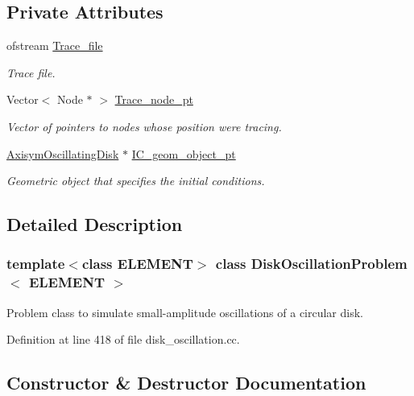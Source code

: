 \subsection*{Private Attributes}
\begin{DoxyCompactItemize}
\item 
ofstream \hyperlink{classDiskOscillationProblem_a45a4b574c10c6416b3b6be950713f505}{Trace\+\_\+file}
\begin{DoxyCompactList}\small\item\em Trace file. \end{DoxyCompactList}\item 
Vector$<$ Node $\ast$ $>$ \hyperlink{classDiskOscillationProblem_a141a79f41b33b19a6fca57793836e4da}{Trace\+\_\+node\+\_\+pt}
\begin{DoxyCompactList}\small\item\em Vector of pointers to nodes whose position we\textquotesingle{}re tracing. \end{DoxyCompactList}\item 
\hyperlink{classAxisymOscillatingDisk}{Axisym\+Oscillating\+Disk} $\ast$ \hyperlink{classDiskOscillationProblem_a338517a04848bb75252751df32879e40}{I\+C\+\_\+geom\+\_\+object\+\_\+pt}
\begin{DoxyCompactList}\small\item\em Geometric object that specifies the initial conditions. \end{DoxyCompactList}\end{DoxyCompactItemize}


\subsection{Detailed Description}
\subsubsection*{template$<$class E\+L\+E\+M\+E\+NT$>$\newline
class Disk\+Oscillation\+Problem$<$ E\+L\+E\+M\+E\+N\+T $>$}

Problem class to simulate small-\/amplitude oscillations of a circular disk. 

Definition at line 418 of file disk\+\_\+oscillation.\+cc.



\subsection{Constructor \& Destructor Documentation}
\mbox{\label{classDiskOscillationProblem_a5ce89d95d655d8c5b579171c8e9a54b9}} 

